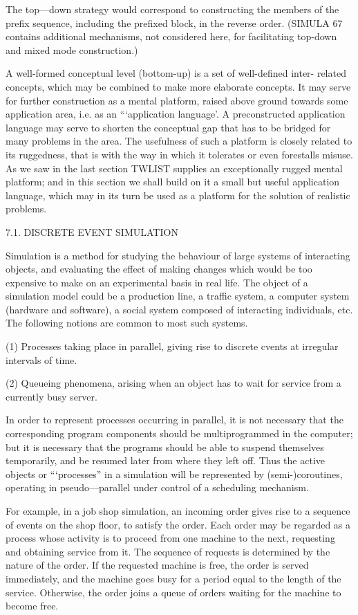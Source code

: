 {{{{{		The top—down strategy would correspond to constructing the members of the prefix sequence, including the prefixed block, in the reverse order. (SIMULA 67 contains additional mechanisms, not considered here, for facilitating top-down and mixed mode construction.)
		
		A well-formed conceptual level (bottom-up) is a set of well-defined inter- related concepts, which may be combined to make more elaborate concepts. It may serve for further construction as a mental platform, raised above ground towards some application area, i.e. as an “‘application language’. A preconstructed application language may serve to shorten the conceptual gap that has to be bridged for many problems in the area. The usefulness of such a platform is closely related to its ruggedness, that is with the way in which it tolerates or even forestalls misuse. As we saw in the last section TWLIST supplies an exceptionally rugged mental platform; and in this section we shall build on it a small but useful application language, which may in its turn be used as a platform for the solution of realistic problems.
		
		7.1. DISCRETE EVENT SIMULATION
		
		Simulation is a method for studying the behaviour of large systems of interacting objects, and evaluating the effect of making changes which would be too expensive to make on an experimental basis in real life. The object of a simulation model could be a production line, a traffic system, a computer system (hardware and software), a social system composed of interacting individuals, etc. The following notions are common to most such systems.
		
		(1) Processes taking place in parallel, giving rise to discrete cvents at irregular intervals of time.
		
		(2) Queueing phenomena, arising when an object has to wait for service from a currently busy server.
		
		In order to represent processes occurring in parallel, it is not necessary that the corresponding program components should be multiprogrammed in the computer; but it is necessary that the programs should be able to suspend themselves temporarily, and be resumed later from where they left off. Thus the active objects or “‘processes” in a simulation will be represented by (semi-)coroutines, operating in pseudo—parallel under control of a scheduling mechanism.
		
		For example, in a job shop simulation, an incoming order gives rise to a sequence of events on the shop floor, to satisfy the order. Each order may be regarded as a process whose activity is to proceed from one machine to the next, requesting and obtaining service from it. The sequence of requests is determined by the nature of the order. If the requested machine is free, the order is served immediately, and the machine goes busy for a period equal to the length of the service. Otherwise, the order joins a queue of orders waiting for the machine to become free.
		
}}}}}
